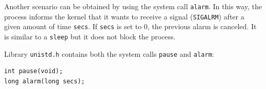 Another scenario can be obtained by using the system call \texttt{alarm}. In this way, the process informs the kernel that it wants to receive a signal (\texttt{SIGALRM}) after a given amount of time \texttt{secs}. If \texttt{secs} is set to 0, the previous alarm is canceled.
It is similar to a \texttt{sleep} but it does not block the process.

Library \texttt{unistd.h} contains both the system calls \texttt{pause} and \texttt{alarm}:
\begin{verbatim}
int pause(void);
long alarm(long secs);
\end{verbatim}